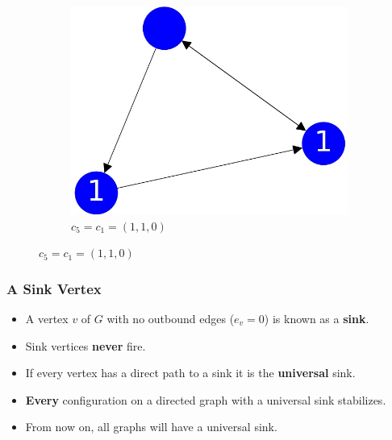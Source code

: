\documentclass{beamer}
\begin{document}
\begin{frame}
\begin{figure}[h!]
\begin{subfigure}[b]{0.3\linewidth}
    \includegraphics[width=\linewidth]{sandpile_simple_1}
    \caption{$c_5 = c_{1} = (1,1,0)$}
  \end{subfigure}

\end{figure}

\end{frame}




\begin{frame}
\frametitle{A Sink Vertex}
  \begin{itemize}
    \item A vertex $v$ of $G$ with no outbound edges ($e_v = 0$) is known as a \textbf{sink}.
    \item Sink vertices \textbf{never} fire.
    \item If every vertex has a direct path to a sink it is the \textbf{universal} sink.
    \item \textbf{Every} configuration on a directed graph with a universal sink stabilizes.
    \item From now on, all graphs will have a universal sink.
  \end{itemize}
\end{frame}
\end{document}

